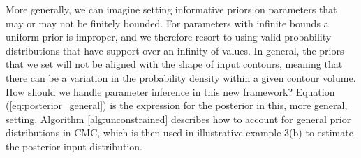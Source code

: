 \documentclass[10pt,letterpaper]{article}
\begin{document}
More generally, we can imagine setting informative priors on parameters that may or may not be finitely bounded. For parameters with infinite bounds a uniform prior is improper, and we therefore resort to using valid probability distributions that have support over an infinity of values. In general, the priors that we set will not be aligned with the shape of input contours, meaning that there can be a variation in the probability density within a given contour volume. How should we handle parameter inference in this new framework? Equation (\ref{eq:posterior_general}) is the expression for the posterior in this, more general, setting. Algorithm \ref{alg:unconstrained} describes how to account for general prior distributions in CMC, which is then used in illustrative example 3(b) to estimate the posterior input distribution.
\end{document}
